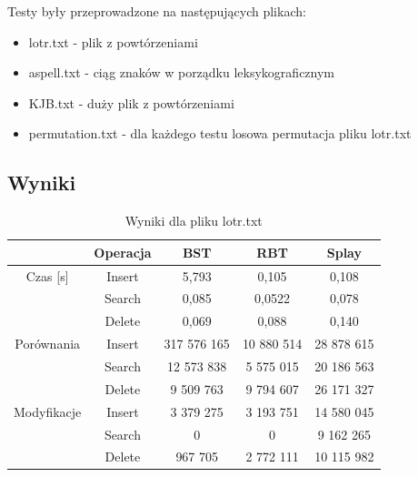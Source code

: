 \documentclass[10pt,a4paper]{article}
\theoremstyle{definition}
\theoremstyle{definition}
\theoremstyle{definition}
\begin{document}
        Testy były przeprowadzone na następujących plikach:
        \begin{itemize}
            \item lotr.txt - plik z powtórzeniami
            \item aspell.txt - ciąg znaków w porządku leksykograficznym
            \item KJB.txt - duży plik z powtórzeniami
            \item permutation.txt - dla każdego testu losowa permutacja pliku lotr.txt
        \end{itemize}
    \subsection{Wyniki}
        \begin{table}[h]
            \centering
            \caption{Wyniki dla pliku lotr.txt}
            \label{tab:lotr}
            \begin{tabular}{|c|c|c|c|c|} \hline
            		 & Operacja & BST & RBT & Splay \\
            		\hline
            		Czas [s] & Insert & 5,793 & 0,105 & 0,108 \\
            		
            		& Search & 0,085 & 0,0522 & 0,078 \\
            	
            		& Delete & 0,069 & 0,088 & 0,140 \\
            		\hline
            		Porównania & Insert & 317 576 165 & 10 880 514 & 28 878 615 \\
            		& Search & 12 573 838 & 5 575 015 & 20 186 563 \\
            		& Delete & 9 509 763 & 9 794 607 & 26 171 327 \\
            		\hline
            		Modyfikacje & Insert & 3 379 275 & 3 193 751 & 14 580 045 \\
            		& Search & 0 & 0 & 9 162 265 \\
            		& Delete & 967 705 & 2 772 111 & 10 115 982 \\
            		\hline 
            \end{tabular}
            \end{table}
            
\end{document}
